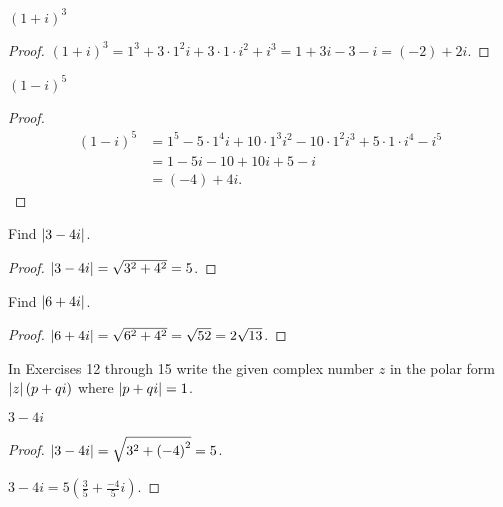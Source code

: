 \begin{exercise}
    ${(1+i)}^{3}$
\end{exercise}

\begin{proof}
    ${(1+i)}^{3} = 1^{3} + 3\cdot 1^{2}i + 3\cdot 1\cdot i^{2} + i^{3} = 1 + 3i - 3 - i = (-2) + 2i$.
\end{proof}

\begin{exercise}
    ${(1-i)}^{5}$
\end{exercise}

\begin{proof}
    \begin{align*}
        {(1-i)}^{5} & = 1^{5} - 5\cdot 1^{4}i + 10\cdot 1^{3}i^{2} - 10\cdot 1^{2}i^{3} + 5\cdot 1\cdot i^{4} - i^{5} \\
                    & = 1 - 5i - 10 + 10i + 5 - i                                                                     \\
                    & = (-4) + 4i.
    \end{align*}
\end{proof}

\begin{exercise}
    Find $\left\vert{3 - 4i}\right\vert$.
\end{exercise}

\begin{proof}
    $\left\vert{3 - 4i}\right\vert = \sqrt{3^{2} + 4^{2}} = 5$.
\end{proof}

\begin{exercise}
    Find $\left\vert{6 + 4i}\right\vert$.
\end{exercise}

\begin{proof}
    $\left\vert{6 + 4i}\right\vert = \sqrt{6^{2} + 4^{2}} = \sqrt{52} = 2\sqrt{13}$.
\end{proof}

In Exercises 12 through 15 write the given complex number $z$ in the polar form $\left\vert{z}\right\vert(p + qi)$ where $\left\vert{p + qi}\right\vert = 1$.

\begin{exercise}
    $3 - 4i$
\end{exercise}

\begin{proof}
    $\left\vert{3 - 4i}\right\vert = \sqrt{3^{2} + {(-4)}^{2}} = 5$.

    $3 - 4i = 5\left(\frac{3}{5} + \frac{-4}{5}i\right)$.
\end{proof}

